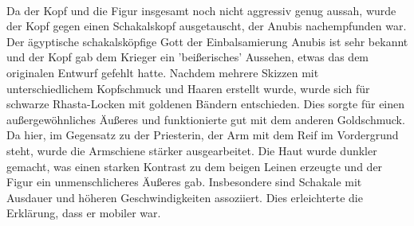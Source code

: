 \documentclass[extern,palatino]{cgBA}
\begin{document}
\\Da der Kopf und die Figur insgesamt noch nicht aggressiv genug aussah, wurde der Kopf gegen einen Schakalskopf ausgetauscht, der Anubis nachempfunden war. Der ägyptische schakalsköpfige Gott der Einbalsamierung Anubis ist sehr bekannt und der Kopf gab dem Krieger ein 'beißerisches' Aussehen, etwas das dem originalen Entwurf gefehlt hatte. Nachdem mehrere Skizzen mit unterschiedlichem Kopfschmuck und Haaren erstellt wurde, wurde sich für schwarze Rhasta-Locken mit goldenen Bändern entschieden. Dies sorgte für einen außergewöhnliches Äußeres und funktionierte gut mit dem anderen Goldschmuck.
\\Da hier, im Gegensatz zu der Priesterin, der Arm mit dem Reif im Vordergrund steht, wurde die Armschiene stärker ausgearbeitet. Die Haut wurde dunkler gemacht, was einen starken Kontrast zu dem beigen Leinen erzeugte und der Figur ein unmenschlicheres Äußeres gab. Insbesondere sind Schakale mit Ausdauer und höheren Geschwindigkeiten assoziiert. Dies erleichterte die Erklärung, dass er mobiler war.
\newpage
\end{document}
